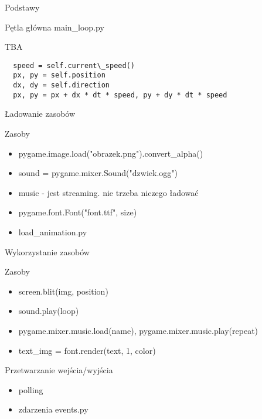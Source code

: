 \documentclass{beamer}
\begin{document}
\begin{frame}[fragile]{Podstawy}
  \begin{exampleblock}{Pętla główna}
    \alert{main\_loop.py}
  \end{exampleblock}

  \begin{block}{TBA}
\begin{verbatim}
  speed = self.current\_speed()
  px, py = self.position
  dx, dy = self.direction
  px, py = px + dx * dt * speed, py + dy * dt * speed
\end{verbatim}
  \end{block}
\end{frame}

\begin{frame}{Ładowanie zasobów}
  \begin{block}{Zasoby}
    \begin{itemize}
    \item pygame.image.load("obrazek.png").convert\_alpha()
    \item sound = pygame.mixer.Sound("dzwiek.ogg")
    \item music - jest streaming. nie trzeba niczego ładować
    \item pygame.font.Font("font.ttf", size)
    \item \alert{load\_animation.py}
    \end{itemize}
  \end{block}
\end{frame}

\begin{frame}{Wykorzystanie zasobów}
  \begin{block}{Zasoby}
    \begin{itemize}
    \item screen.blit(img, position)
    \item sound.play(loop)
    \item pygame.mixer.music.load(name), pygame.mixer.music.play(repeat)
    \item text\_img = font.render(text, 1, color)
    \end{itemize}
  \end{block}
\end{frame}

\begin{frame}{Przetwarzanie wejścia/wyjścia}
  \begin{block}{}
    \begin{itemize}
    \item polling
    \item zdarzenia \alert{events.py}
    \end{itemize}
  \end{block}
\end{frame}
\end{document}
